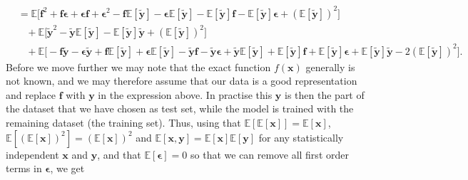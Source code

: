 \documentclass[aps,pra,english,notitlepage,reprint,nofootinbib]{revtex4-1}  %
\begin{document}
\begin{align*}
&= \mathbb{E}\Big[\mathbf{f}^2 + \mathbf{f}\boldsymbol{\epsilon} + \boldsymbol{\epsilon}\mathbf{f} + \boldsymbol{\epsilon}^2 - \mathbf{f}\mathbb{E}\left[\mathbf{\tilde{y}}\right] -\boldsymbol{\epsilon}\mathbb{E}\left[\mathbf{\tilde{y}}\right] -\mathbb{E}\left[\mathbf{\tilde{y}}\right]\mathbf{f} -\mathbb{E}\left[\mathbf{\tilde{y}}\right]\boldsymbol{\epsilon}  + \left(\mathbb{E}\left[\mathbf{\tilde{y}}\right]\right)^2\Big]
\\
&\hspace{10pt} + \mathbb{E}\Big[\mathbf{\tilde{y}}^2 - \mathbf{\tilde{y}}\mathbb{E}\left[\mathbf{\tilde{y}}\right] - \mathbb{E}\left[\mathbf{\tilde{y}}\right]\mathbf{\tilde{y}} + \left(\mathbb{E}\left[\mathbf{\tilde{y}}\right]\right)^2\Big]
\\
&\hspace{10pt} +\mathbb{E}\Big[-\mathbf{f}\mathbf{\tilde{y}}- \boldsymbol{\epsilon}\mathbf{\tilde{y}} + \mathbf{f}\mathbb{E}\left[\mathbf{\tilde{y}} \right]+ \boldsymbol{\epsilon}\mathbb{E}\left[\mathbf{\tilde{y}} \right]  - \mathbf{\tilde{y}}\mathbf{f}- \mathbf{\tilde{y}}\boldsymbol{\epsilon} + \mathbf{\tilde{y}}\mathbb{E}\left[\mathbf{\tilde{y}}\right] + \mathbb{E}\left[\mathbf{\tilde{y}}\right]\mathbf{f}+ \mathbb{E}\left[\mathbf{\tilde{y}}\right]\boldsymbol{\epsilon} + \mathbb{E}\left[\mathbf{\tilde{y}}\right]\mathbf{\tilde{y}} - 2\left(\mathbb{E}\left[\mathbf{\tilde{y}}\right]\right)^2\Big].
\end{align*}
Before we move further we may note that the exact function $f(\mathbf{x})$ generally is not known, and we may therefore assume that our data is a good representation and replace $\mathbf{f}$ with $\mathbf{y}$ in the expression above. In practise this $\mathbf{y}$ is then the part of the dataset that we have chosen as test set, while the model is trained with the remaining dataset (the training set). Thus, using that $\mathbb{E}[\mathbb{E}[\mathbf{x}]]= \mathbb{E}[\mathbf{x}]$, $\mathbb{E}[(\mathbb{E}[\mathbf{x}])^2] = (\mathbb{E}[\mathbf{x}])^2$ and $\mathbb{E}[\mathbf{x},\mathbf{y}]=\mathbb{E}[\mathbf{x}]\mathbb{E}[\mathbf{y}]$ for any statistically independent $\mathbf{x}$ and $\mathbf{y}$, and that $\mathbb{E}[\boldsymbol{\epsilon}]=0$ so that we can remove all first order terms in $\boldsymbol{\epsilon}$, we get
\end{document}
